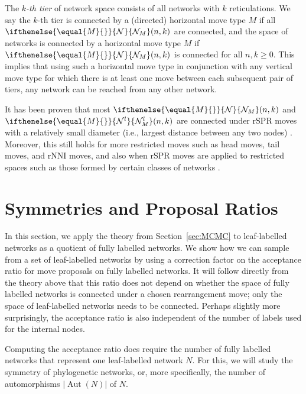 \documentclass{article}
\theoremstyle{definition}
\newcommand{\N}[1][]{
\ifthenelse{\equal{#1}{}}{\mathcal{N}}{\mathcal{N}_{#1}}%
}
\newcommand{\Ni}[1][]{
\ifthenelse{\equal{#1}{}}{\mathcal{N}^l}{\mathcal{N}^l_{#1}}%
}
\DeclareMathOperator{\Aut}{Aut}
\newcommand{\rSPR}{\mathrm{rSPR}}
\begin{document}
The \emph{$k$-th tier} \cite{francis2017bounds,huber2016transforming} of network space consists of all networks with $k$ reticulations. We say the $k$-th tier is connected by a (directed) horizontal move type $M$ if all $\N[M](n,k)$ are connected, and the space of networks is connected by a horizontal move type $M$ if $\N[M](n,k)$ is connected for all $n,k\geq 0$. This implies that using such a horizontal move type in conjunction with any vertical move type for which there is at least one move between each subsequent pair of tiers, any network can be reached from any other network.

It has been proven that most $\N[M](n,k)$ and $\Ni[M](n,k)$ are connected under $\rSPR$ moves with a relatively small diameter (i.e., largest distance between any two nodes) \cite{janssen2018exploring, thesis_janssen}. Moreover, this still holds for more restricted moves such as head moves, tail moves, and rNNI moves\cite{janssen2019rearrangement, thesis_janssen}, and also when $\rSPR$ moves are applied to restricted spaces such as those formed by certain classes of networks \cite{klawitter2020spaces}.



\section{Symmetries and Proposal Ratios}\label{sec:ProposalRatios}
In this section, we apply the theory from Section~\ref{sec:MCMC} to leaf-labelled networks as a quotient of fully labelled networks. We show how we can sample from a set of leaf-labelled networks by using a correction factor on the acceptance ratio for move proposals on fully labelled networks. It will follow directly from the theory above that this ratio does not depend on whether the space of fully labelled networks is connected under a chosen rearrangement move; only the space of leaf-labelled networks needs to be connected. Perhaps slightly more surprisingly, the acceptance ratio is also independent of the number of labels used for the internal nodes. 

Computing the acceptance ratio does require the number of fully labelled networks that represent one leaf-labelled network $N$. For this, we will study the symmetry of phylogenetic networks, or, more specifically, the number of automorphisms $|\Aut(N)|$ of $N$.
\end{document}
